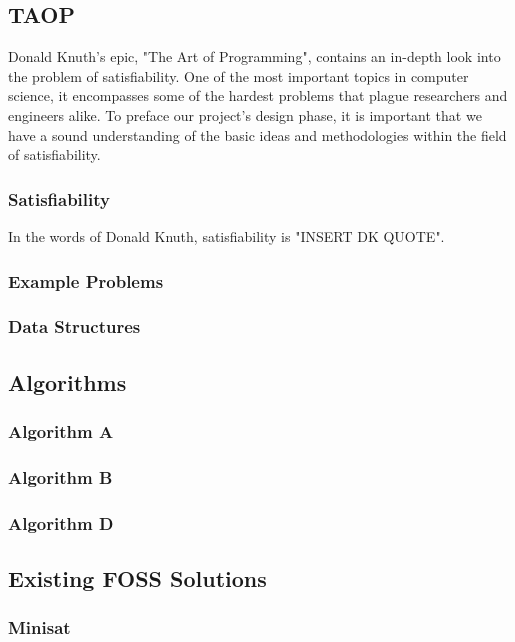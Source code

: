 \documentclass{article}
\begin{document}
\subsection{TAOP}
Donald Knuth's epic, "The Art of Programming", contains an in-depth look into the problem of satisfiability. One of the most important topics in computer
science, it encompasses some of the hardest problems that plague researchers and engineers alike. To preface our project's design phase, it is important
that we have a sound understanding of the basic ideas and methodologies within the field of satisfiability.

\subsubsection{Satisfiability}
In the words of Donald Knuth, satisfiability is "INSERT DK QUOTE".

\subsubsection{Example Problems}

\subsubsection{Data Structures}

\subsection{Algorithms}
\subsubsection{Algorithm A}
\subsubsection{Algorithm B}
\subsubsection{Algorithm D}

\subsection{Existing FOSS Solutions}
\subsubsection{Minisat}
\end{document}
